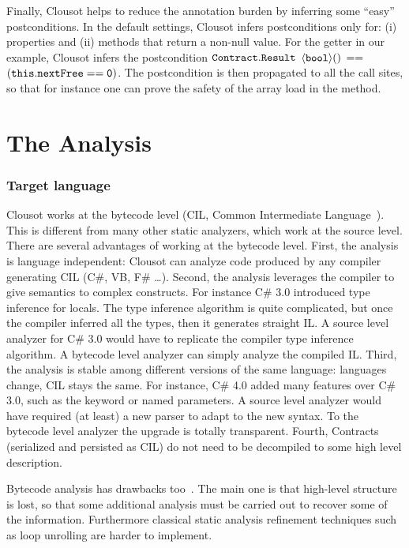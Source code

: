 \documentclass{llncs}
\begin{document}
Finally, Clousot helps to reduce the annotation burden by inferring
some ``easy'' postconditions.  In the default settings, Clousot infers
postconditions only for: (i) properties and (ii) methods that return a
non-null value.  For the getter  in our example, Clousot
infers the postcondition $\mathtt{Contract.Result}$ $\mathtt{\langle
  bool\rangle()}$ $\mathtt{==}$ $\mathtt{(this.nextFree == 0)}$.  The
postcondition is then propagated to all the call sites, so that for
instance one can prove the safety of the array load in the
 method.

\section{The Analysis}
\label{sec:analysis}
\subsubsection{Target language}
Clousot works at the bytecode level (CIL, Common Intermediate
Language~\cite{ecma}).  This is different from many other static
analyzers, which work at the source level.  There are several
advantages of working at the bytecode level.  First, the analysis is
language independent: Clousot can analyze code produced by any
compiler generating CIL (C\#, VB, F\# \dots).  Second, the analysis
leverages the compiler to give semantics to complex constructs.  For
instance C\# 3.0 introduced type inference for locals.  The type
inference algorithm is quite complicated, but once the compiler
inferred all the types, then it generates straight IL.  A source level
analyzer for C\# 3.0 would have to replicate the compiler type
inference algorithm.  A bytecode level analyzer can simply analyze the
compiled IL.  Third, the analysis is stable among different versions
of the same language: languages change, CIL stays the same.  For
instance, C\# 4.0 added many features over C\# 3.0, such as the
 keyword or named parameters.  A source level analyzer
would have required (at least) a new parser to adapt to the new
syntax.  To the bytecode level analyzer the upgrade is totally
transparent.  Fourth, Contracts (serialized and persisted as CIL) do
not need to be decompiled to some high level description.

Bytecode analysis has drawbacks too~\cite{LogozzoMaf08}.  The main one
is that high-level structure is lost, so that some additional analysis
must be carried out to recover some of the information.  Furthermore
classical static analysis refinement techniques such as loop unrolling
are harder to implement.
\end{document}
